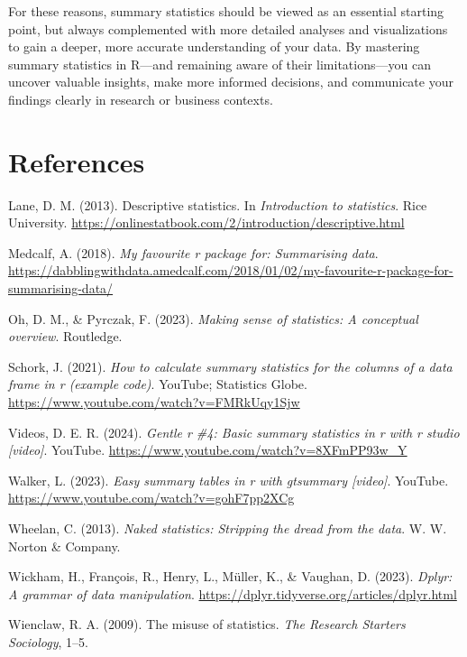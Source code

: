 \documentclass[
  man,
  floatsintext,
  longtable,
  nolmodern,
  notxfonts,
  notimes,
  colorlinks=true,linkcolor=blue,citecolor=blue,urlcolor=blue]{apa7}
\newlength{\cslhangindent}
\newenvironment{CSLReferences}[2] %
 {\begin{list}{}{%
  \setlength{\itemindent}{0pt}
  \setlength{\leftmargin}{0pt}
  \setlength{\parsep}{0pt}
  \ifodd #1
   \setlength{\leftmargin}{\cslhangindent}
   \setlength{\itemindent}{-1\cslhangindent}
  \fi
  \setlength{\itemsep}{#2\baselineskip}}}
 {\end{list}}
\begin{document}
For these reasons, summary statistics should be viewed as an essential
starting point, but always complemented with more detailed analyses and
visualizations to gain a deeper, more accurate understanding of your
data. By mastering summary statistics in R---and remaining aware of
their limitations---you can uncover valuable insights, make more
informed decisions, and communicate your findings clearly in research or
business contexts.

\newpage

\section{References}\label{references}

\label{refs}
\begin{CSLReferences}{1}{0}
Lane, D. M. (2013). Descriptive statistics. In \emph{Introduction to
statistics}. Rice University.
\url{https://onlinestatbook.com/2/introduction/descriptive.html}

Medcalf, A. (2018). \emph{My favourite r package for: Summarising data}.
\url{https://dabblingwithdata.amedcalf.com/2018/01/02/my-favourite-r-package-for-summarising-data/}

Oh, D. M., \& Pyrczak, F. (2023). \emph{Making sense of statistics: A
conceptual overview}. Routledge.

Schork, J. (2021). \emph{How to calculate summary statistics for the
columns of a data frame in r (example code)}. YouTube; Statistics Globe.
\url{https://www.youtube.com/watch?v=FMRkUqy1Sjw}

Videos, D. E. R. (2024). \emph{Gentle r \#4: Basic summary statistics in
r with r studio {[}video{]}}. YouTube.
\url{https://www.youtube.com/watch?v=8XFmPP93w_Y}

Walker, L. (2023). \emph{Easy summary tables in r with gtsummary
{[}video{]}}. YouTube. \url{https://www.youtube.com/watch?v=gohF7pp2XCg}

Wheelan, C. (2013). \emph{Naked statistics: Stripping the dread from the
data}. W. W. Norton \& Company.

Wickham, H., François, R., Henry, L., Müller, K., \& Vaughan, D. (2023).
\emph{Dplyr: A grammar of data manipulation}.
\url{https://dplyr.tidyverse.org/articles/dplyr.html}

Wienclaw, R. A. (2009). The misuse of statistics. \emph{The Research
Starters Sociology}, 1--5.

\end{CSLReferences}
\end{document}
